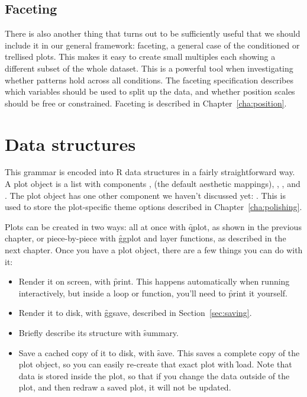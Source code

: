 \subsection{Faceting}\label{sec:intro-faceting}

There is also another thing that turns out to be sufficiently useful that we should include it in our general framework: faceting, a general case of the conditioned or trellised plots. This makes it easy to create small multiples each showing a different subset of the whole dataset. This is a powerful tool when investigating whether patterns hold across all conditions. The faceting specification describes which variables should be used to split up the data, and whether position scales should be free or constrained. Faceting is described in Chapter~\ref{cha:position}.

\section{Data structures}
\label{sec:data-structures}

This grammar is encoded into R data structures in a fairly straightforward way. A plot object is a list with components ,  (the default aesthetic mappings), , ,  and . The plot object has one other component we haven't discussed yet: . This is used to store the plot-specific theme options described in Chapter~\ref{cha:polishing}.

Plots can be created in two ways: all at once with \f{qplot}, as shown in the previous chapter, or piece-by-piece with \f{ggplot} and layer functions, as described in the next chapter.  Once you have a plot object, there are a few things you can do with it:

\begin{itemize}
  \item Render it on screen, with \f{print}.  This happens automatically when
  running interactively, but inside a loop or function, you'll need to
  \f{print} it yourself.
  
  \item Render it to disk, with \f{ggsave}, described in Section~\ref{sec:saving}.

  \item Briefly describe its structure with \f{summary}.
  
  \item Save a cached copy of it to disk, with \f{save}.  This saves a complete copy of the plot object, so you can easily re-create that exact plot with \f{load}.  Note that data is stored inside the plot, so that if you change the data outside of the plot, and then redraw a saved plot, it will not be updated. 
\end{itemize}

